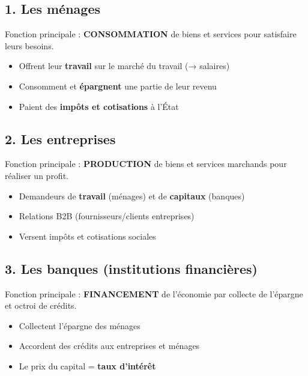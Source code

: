 \documentclass[11pt,a4paper]{article}
\begin{document}
\subsection*{1. Les ménages}
\begin{keybox}
Fonction principale : \textbf{CONSOMMATION} de biens et services pour satisfaire leurs besoins.
\end{keybox}
\begin{itemize}
  \item Offrent leur \textbf{travail} sur le marché du travail (→ salaires)
  \item Consomment et \textbf{épargnent} une partie de leur revenu
  \item Paient des \textbf{impôts et cotisations} à l'État
\end{itemize}

\subsection*{2. Les entreprises}
\begin{keybox}
Fonction principale : \textbf{PRODUCTION} de biens et services marchands pour réaliser un profit.
\end{keybox}
\begin{itemize}
  \item Demandeurs de \textbf{travail} (ménages) et de \textbf{capitaux} (banques)
  \item Relations B2B (fournisseurs/clients entreprises)
  \item Versent impôts et cotisations sociales
\end{itemize}

\subsection*{3. Les banques (institutions financières)}
\begin{keybox}
Fonction principale : \textbf{FINANCEMENT} de l'économie par collecte de l'épargne et octroi de crédits.
\end{keybox}
\begin{itemize}
  \item Collectent l'épargne des ménages
  \item Accordent des crédits aux entreprises et ménages
  \item Le prix du capital = \textbf{taux d'intérêt}
\end{itemize}
\end{document}
